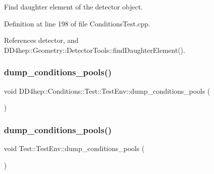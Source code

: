 Find daughter element of the detector object. 



Definition at line 198 of file Conditions\+Test.\+cpp.



References detector, and D\+D4hep\+::\+Geometry\+::\+Detector\+Tools\+::find\+Daughter\+Element().

\hypertarget{struct_d_d4hep_1_1_conditions_1_1_test_1_1_test_env_aa74188c37deebb75495bbdb2964d2228}{}\label{struct_d_d4hep_1_1_conditions_1_1_test_1_1_test_env_aa74188c37deebb75495bbdb2964d2228} 
\subsubsection{\texorpdfstring{dump\+\_\+conditions\+\_\+pools()}{dump\_conditions\_pools()}\hspace{0.1cm}{\footnotesize\ttfamily [1/2]}}
{\footnotesize\ttfamily void D\+D4hep\+::\+Conditions\+::\+Test\+::\+Test\+Env\+::dump\+\_\+conditions\+\_\+pools (\begin{DoxyParamCaption}{ }\end{DoxyParamCaption})}

\hypertarget{struct_d_d4hep_1_1_conditions_1_1_test_1_1_test_env_a2140fd3bd795ea5f7f3fdcb9d3963d9c}{}\label{struct_d_d4hep_1_1_conditions_1_1_test_1_1_test_env_a2140fd3bd795ea5f7f3fdcb9d3963d9c} 
\subsubsection{\texorpdfstring{dump\+\_\+conditions\+\_\+pools()}{dump\_conditions\_pools()}\hspace{0.1cm}{\footnotesize\ttfamily [2/2]}}
{\footnotesize\ttfamily void Test\+::\+Test\+Env\+::dump\+\_\+conditions\+\_\+pools (\begin{DoxyParamCaption}{ }\end{DoxyParamCaption})}



